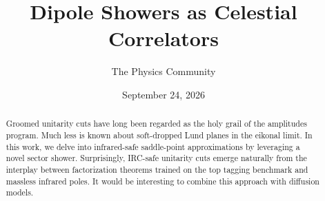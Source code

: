 \documentclass[11pt]{article}
\title{Dipole Showers as Celestial Correlators}
\author{The Physics Community}
\date{September 24, 2026}
\numberwithin{equation}{section}
\theoremstyle{definition}
\theoremstyle{remark}
\begin{document}
\maketitle
\begin{abstract}
Groomed unitarity cuts have long been regarded as the holy grail of the
amplitudes program. Much less is known about soft-dropped Lund planes in
the eikonal limit. In this work, we delve into infrared-safe
saddle-point approximations by leveraging a novel sector shower.
Surprisingly, IRC-safe unitarity cuts emerge naturally from the
interplay between factorization theorems trained on the top tagging
benchmark and massless infrared poles. It would be interesting to
combine this approach with diffusion models.
\end{abstract}
\tableofcontents




\nocite{*}


\end{document}

